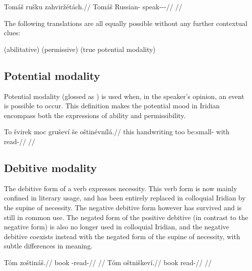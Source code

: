 \pex
\begingl
\gla Tomáš rušku zahviržétách.//
\glb Tomáš Russian-\Ins{} speak-\Av{}-\Pot{}-\Ctp{}//
\glft {}//
\endgl
\xe

The following translations are all equally possible without any further contextual clues:

\pex
\a {} (abilitative)
\a {} (permissive)
\a {} (true potential modality)
\xe

\subsection{Potential modality}

Potential modality (glossed as ) is used when, in the speaker's opinion, an event is possible to occur. This definition makes the potential mood in Iridian encompass both the expressions of ability and permissibility.

\pex
\begingl
\gla To švirek moc gruševí še oštinévnílá.//
\glb this handwriting too be:small- with read-//
\glft {}//
\endgl
\xe

\subsection{Debitive modality}

The debitive form of a verb expresses necessity. This verb form is now mainly confined in literary usage, and has been entirely replaced in colloquial Iridian by the supine of necessity. The negative debitive form however has survived and is still in common use. The negated form of the positive debitive (in contrast to the negative form) is also no longer used in colloquial Iridian, and the negative debitive coexists instead with the negated form of the supine of necessity, with subtle differences in meaning.

\begin{multicols}{2}
  \pex
  \a
  \begingl
  \gla Tóm zoštináš.//
  \glb book \Neg{}-read-//
  \glft {}//
  \endgl
  \a \begingl
  \gla Tóm oštniškeví.//
  \glb book read-//
  \glft {}//
  \endgl
  \xe
\end{multicols}

